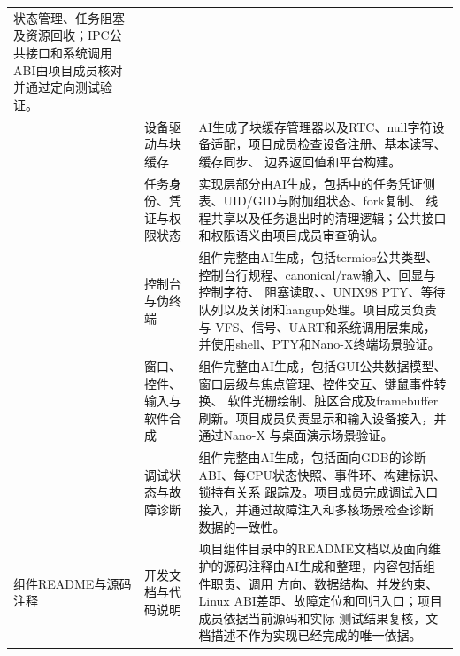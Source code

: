 \begin{longtable}{L{2.8cm}L{2.3cm}L{9.1cm}}
  状态管理、任务阻塞及资源回收；IPC公共接口和系统调用ABI由项目成员核对并通过定向测试验证。\\
   & 设备驱动与块缓存 &
  AI生成了块缓存管理器以及RTC、null字符设备适配，项目成员检查设备注册、基本读写、缓存同步、
  边界返回值和平台构建。\\
   & 任务身份、凭证与权限状态 &
  实现层部分由AI生成，包括中的任务凭证侧表、UID/GID与附加组状态、fork复制、
  线程共享以及任务退出时的清理逻辑；公共接口和权限语义由项目成员审查确认。\\
   & 控制台与伪终端 &
  组件完整由AI生成，包括termios公共类型、控制台行规程、canonical/raw输入、回显与控制字符、
  阻塞读取、、UNIX98 PTY、等待队列以及关闭和hangup处理。项目成员负责与
  VFS、信号、UART和系统调用层集成，并使用shell、PTY和Nano-X终端场景验证。\\
   & 窗口、控件、输入与软件合成 &
  组件完整由AI生成，包括GUI公共数据模型、窗口层级与焦点管理、控件交互、键鼠事件转换、
  软件光栅绘制、脏区合成及framebuffer刷新。项目成员负责显示和输入设备接入，并通过Nano-X
  与桌面演示场景验证。\\
   & 调试状态与故障诊断 &
  组件完整由AI生成，包括面向GDB的诊断ABI、每CPU状态快照、事件环、构建标识、锁持有关系
  跟踪及。项目成员完成调试入口接入，并通过故障注入和多核场景检查诊断
  数据的一致性。\\
  组件README与源码注释 & 开发文档与代码说明 &
  项目组件目录中的README文档以及面向维护的源码注释由AI生成和整理，内容包括组件职责、调用
  方向、数据结构、并发约束、Linux ABI差距、故障定位和回归入口；项目成员依据当前源码和实际
  测试结果复核，文档描述不作为实现已经完成的唯一依据。\\
  \bottomrule
\end{longtable}
